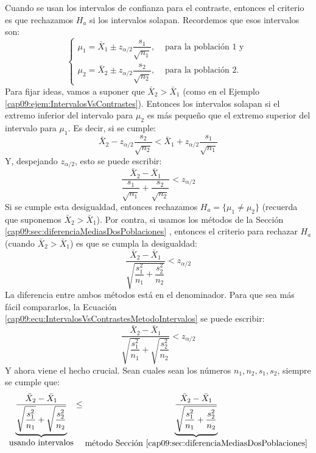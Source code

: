 Cuando se usan los intervalos de confianza para el contraste, entonces el criterio es que rechazamos $H_a$ si los intervalos solapan. Recordemos que esos intervalos son:
\[
\begin{cases}
\mu_1=\bar X_1\pm z_{\alpha/2}\dfrac{s_1}{\sqrt{n_1}},&\mbox{ para la población $1$ y }\\[3mm]
\mu_2=\bar X_2\pm z_{\alpha/2}\dfrac{s_2}{\sqrt{n_2}},&\mbox{ para la población $2$.}
\end{cases}
\]
Para fijar ideas, vamos a suponer que $\bar X_2>\bar X_1$ (como en el Ejemplo \ref{cap09:ejem:IntervalosVsContrastes}). Entonces los intervalos solapan si el extremo inferior del intervalo para $\mu_2$ es más pequeño que el extremo superior del intervalo para $\mu_1$. Es decir, si se cumple:
\[ \bar X_2 - z_{\alpha/2}\dfrac{s_2}{\sqrt{n_2}} < \bar X_1 + z_{\alpha/2}\dfrac{s_1}{\sqrt{n_1}}\]
Y, despejando $z_{\alpha/2}$, esto se puede escribir:
\begin{equation}
\label{cap09:ecu:IntervalosVsContrastesMetodoIntervalos}
\dfrac{\bar X_2 - \bar X_1}{\dfrac{s_1}{\sqrt{n_1}} + \dfrac{s_2}{\sqrt{n_2}}} < z_{\alpha/2}
\end{equation}
Si se cumple esta desigualdad, entonces rechazamos $H_a=\{\mu_1\neq\mu_2\}$ (recuerda que suponemos $\bar X_2>\bar X_1$). Por contra, si usamos los métodos de la Sección \ref{cap09:sec:diferenciaMediasDosPoblaciones} , entonces el criterio para rechazar $H_a$ (cuando $\bar X_2>\bar X_1$) es que se cumpla la desigualdad:
\begin{equation}
\label{cap09:ecu:IntervalosVsContrastesMetodoContrastes}
    \dfrac{\bar X_2 - \bar X_1}{\sqrt{\dfrac{s_1^2}{n_1}+\dfrac{s_2^2}{n_2}}} < z_{\alpha/2}
\end{equation}
La diferencia entre ambos métodos está en el denominador. Para que sea más fácil compararlos, la Ecuación \ref{cap09:ecu:IntervalosVsContrastesMetodoIntervalos} se puede escribir:
\[\dfrac{\bar X_2 - \bar X_1}{\sqrt{\dfrac{s_1^2}{n_1}} + \sqrt{\dfrac{s_2^2}{n_2}}} < z_{\alpha/2}\]
Y ahora viene el hecho crucial. Sean cuales sean los números $n_1, n_2, s_1, s_2$, siempre se cumple que:
\begin{equation}
\label{cap09:ecu:IntervalosVsContrastesPitagoras}
\underbrace{
\dfrac{\bar X_2 - \bar X_1}{\sqrt{\dfrac{s_1^2}{n_1}} + \sqrt{\dfrac{s_2^2}{n_2}}}}
_{
\mbox{usando intervalos}
}
\leq
\underbrace{\dfrac{\bar X_2 - \bar X_1}{\sqrt{\dfrac{s_1^2}{n_1}+\dfrac{s_2^2}{n_2}}}}
_{
\mbox{método Sección \ref{cap09:sec:diferenciaMediasDosPoblaciones}}
}
\end{equation}

